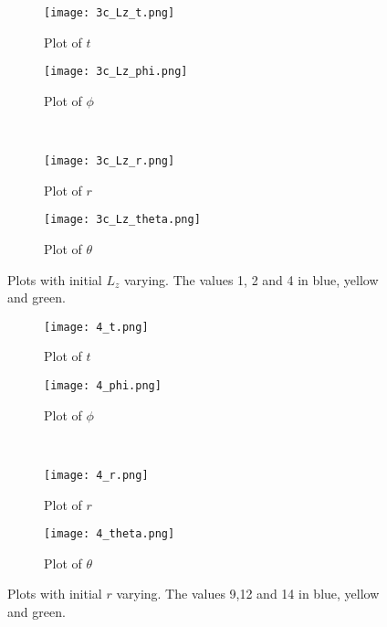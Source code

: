 \documentclass[12pt]{extarticle}
\begin{document}
\begin{figure}[h]
    \centering
    \begin{subfigure}[b]{0.4\textwidth}
        \texttt{[image: 3c\_Lz\_t.png]}
        \caption{Plot of $t$}
        \label{figure:10a}
    \end{subfigure}  
    \qquad
    \begin{subfigure}[b]{0.4\textwidth}
        \texttt{[image: 3c\_Lz\_phi.png]}
        \caption{Plot of $\phi$}
        \label{figure:10b}
    \end{subfigure} 
    \\ 
    \begin{subfigure}[b]{0.4\textwidth}
        \texttt{[image: 3c\_Lz\_r.png]}
        \caption{Plot of $r$}
        \label{figure:10c}
    \end{subfigure} 
    \qquad
    \begin{subfigure}[b]{0.4\textwidth}
        \texttt{[image: 3c\_Lz\_theta.png]}
        \caption{Plot of $\theta$}
        \label{figure:10d}
    \end{subfigure}
    \caption{Plots with initial $L_z$ varying. The values 1, 2 and 4 in blue, yellow and green.}
    \label{figure 10}
\end{figure}

\begin{figure}[h]
    \centering
    \begin{subfigure}[b]{0.4\textwidth}
        \texttt{[image: 4\_t.png]}
        \caption{Plot of $t$}
        \label{figure:11a}
    \end{subfigure}  
    \qquad
    \begin{subfigure}[b]{0.4\textwidth}
        \texttt{[image: 4\_phi.png]}
        \caption{Plot of $\phi$}
        \label{figure:11b}
    \end{subfigure} 
    \\ 
    \begin{subfigure}[b]{0.4\textwidth}
        \texttt{[image: 4\_r.png]}
        \caption{Plot of $r$}
        \label{figure:11c}
    \end{subfigure} 
    \qquad
    \begin{subfigure}[b]{0.4\textwidth}
        \texttt{[image: 4\_theta.png]}
        \caption{Plot of $\theta$}
        \label{figure:11d}
    \end{subfigure}
    \caption{Plots with initial $r$ varying. The values 9,12 and 14 in blue, yellow and green.}
    \label{figure 11}
\end{figure}
\end{document}
